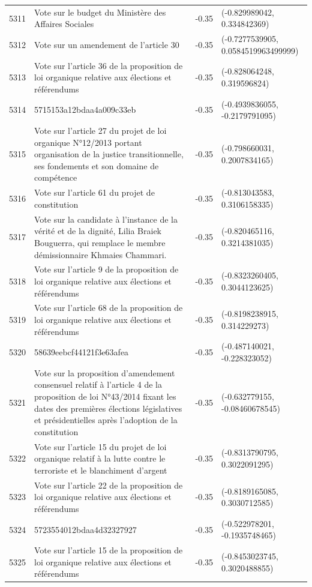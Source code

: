 \begin{table}[ht]
\begin{tabular}{rlrl}
  5311 & Vote sur le budget du Ministère des Affaires Sociales & -0.35 & (-0.829989042, 0.334842369) \\ 
  5312 & Vote sur un amendement de l'article 30 & -0.35 & (-0.7277539905, 0.0584519963499999) \\ 
  5313 & Vote sur l'article 36 de la proposition de loi organique relative aux élections et référendums & -0.35 & (-0.828064248, 0.319596824) \\ 
  5314 & 5715153a12bdaa4a009c33eb & -0.35 & (-0.4939836055, -0.2179791095) \\ 
  5315 & Vote sur l'article 27 du projet de loi organique N°12/2013 portant organisation de la justice transitionnelle, ses fondements et son domaine de compétence & -0.35 & (-0.798660031, 0.2007834165) \\ 
  5316 & Vote sur l'article 61 du projet de constitution & -0.35 & (-0.813043583, 0.3106158335) \\ 
  5317 & Vote sur la candidate à l'instance de la vérité et de la dignité, Lilia Braiek Bouguerra, qui remplace le membre démissionnaire Khmaies Chammari. & -0.35 & (-0.820465116, 0.3214381035) \\ 
  5318 & Vote sur l'article 9 de la proposition de loi organique relative aux élections et référendums & -0.35 & (-0.8323260405, 0.3044123625) \\ 
  5319 & Vote sur l'article 68 de la proposition de loi organique relative aux élections et référendums & -0.35 & (-0.8198238915, 0.314229273) \\ 
  5320 & 58639eebcf44121f3e63afea & -0.35 & (-0.487140021, -0.228323052) \\ 
  5321 & Vote sur la proposition d'amendement consensuel relatif à l'article 4 de la proposition de loi N°43/2014 fixant les dates des premières élections législatives et présidentielles après l'adoption de la constitution & -0.35 & (-0.632779155, -0.08460678545) \\ 
  5322 & Vote sur l'article 15 du projet de loi organique relatif à la lutte contre le terroriste et le blanchiment d'argent & -0.35 & (-0.8313790795, 0.3022091295) \\ 
  5323 & Vote sur l'article 22 de la proposition de loi organique relative aux élections et référendums & -0.35 & (-0.8189165085, 0.3030712585) \\ 
  5324 & 5723554012bdaa4d32327927 & -0.35 & (-0.522978201, -0.1935748465) \\ 
  5325 & Vote sur l'article 15 de la proposition de loi organique relative aux élections et référendums & -0.35 & (-0.8453023745, 0.3020488855) \\ 

\end{tabular}
\end{table}

